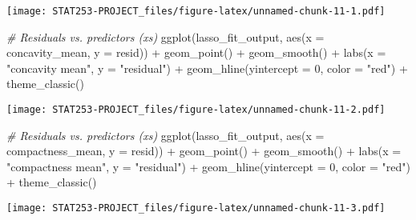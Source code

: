 \documentclass[
]{article}
\newenvironment{Shaded}{\begin{snugshade}}{\end{snugshade}}
\newcommand{\AttributeTok}[1]{\textcolor[rgb]{0.77,0.63,0.00}{#1}}
\newcommand{\CommentTok}[1]{\textcolor[rgb]{0.56,0.35,0.01}{\textit{#1}}}
\newcommand{\DecValTok}[1]{\textcolor[rgb]{0.00,0.00,0.81}{#1}}
\newcommand{\FunctionTok}[1]{\textcolor[rgb]{0.00,0.00,0.00}{#1}}
\newcommand{\NormalTok}[1]{#1}
\newcommand{\SpecialCharTok}[1]{\textcolor[rgb]{0.00,0.00,0.00}{#1}}
\newcommand{\StringTok}[1]{\textcolor[rgb]{0.31,0.60,0.02}{#1}}
\begin{document}
\texttt{[image: STAT253-PROJECT\_files/figure-latex/unnamed-chunk-11-1.pdf]}

\begin{Shaded}
\begin{Highlighting}[]
\CommentTok{\# Residuals vs. predictors (x\textquotesingle{}s) }
\FunctionTok{ggplot}\NormalTok{(lasso\_fit\_output, }\FunctionTok{aes}\NormalTok{(}\AttributeTok{x =}\NormalTok{ concavity\_mean, }\AttributeTok{y =}\NormalTok{ resid)) }\SpecialCharTok{+}
  \FunctionTok{geom\_point}\NormalTok{() }\SpecialCharTok{+}
  \FunctionTok{geom\_smooth}\NormalTok{() }\SpecialCharTok{+}
  \FunctionTok{labs}\NormalTok{(}\AttributeTok{x =} \StringTok{"concavity mean"}\NormalTok{, }\AttributeTok{y =} \StringTok{"residual"}\NormalTok{) }\SpecialCharTok{+}
  \FunctionTok{geom\_hline}\NormalTok{(}\AttributeTok{yintercept =} \DecValTok{0}\NormalTok{, }\AttributeTok{color =} \StringTok{"red"}\NormalTok{) }\SpecialCharTok{+}
  \FunctionTok{theme\_classic}\NormalTok{()}
\end{Highlighting}
\end{Shaded}

\texttt{[image: STAT253-PROJECT\_files/figure-latex/unnamed-chunk-11-2.pdf]}

\begin{Shaded}
\begin{Highlighting}[]
\CommentTok{\# Residuals vs. predictors (x\textquotesingle{}s) }
\FunctionTok{ggplot}\NormalTok{(lasso\_fit\_output, }\FunctionTok{aes}\NormalTok{(}\AttributeTok{x =}\NormalTok{ compactness\_mean, }\AttributeTok{y =}\NormalTok{ resid)) }\SpecialCharTok{+}
  \FunctionTok{geom\_point}\NormalTok{() }\SpecialCharTok{+}
  \FunctionTok{geom\_smooth}\NormalTok{() }\SpecialCharTok{+}
  \FunctionTok{labs}\NormalTok{(}\AttributeTok{x =} \StringTok{"compactness mean"}\NormalTok{, }\AttributeTok{y =} \StringTok{"residual"}\NormalTok{) }\SpecialCharTok{+}
  \FunctionTok{geom\_hline}\NormalTok{(}\AttributeTok{yintercept =} \DecValTok{0}\NormalTok{, }\AttributeTok{color =} \StringTok{"red"}\NormalTok{) }\SpecialCharTok{+}
  \FunctionTok{theme\_classic}\NormalTok{()}
\end{Highlighting}
\end{Shaded}

\texttt{[image: STAT253-PROJECT\_files/figure-latex/unnamed-chunk-11-3.pdf]}
\end{document}
